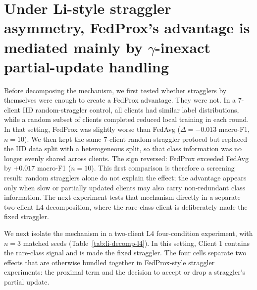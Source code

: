 \documentclass[11pt,a4paper]{report}
\begin{document}


\section{Under Li-style straggler asymmetry, FedProx's advantage is mediated
mainly by $\gamma$-inexact partial-update handling}
\label{sec:li-straggler}

Before decomposing the mechanism, we first tested whether stragglers by
themselves were enough to create a FedProx advantage. They were not. In a
7-client IID random-straggler control, all clients had similar label
distributions, while a random subset of clients completed reduced local
training in each round. In that setting, FedProx was slightly worse than
FedAvg ($\Delta = -0.013$ macro-F1, $n = 10$). We then kept the same
7-client random-straggler protocol but replaced the IID data split with a
heterogeneous split, so that class information was no longer evenly shared
across clients. The sign reversed: FedProx exceeded FedAvg by $+0.017$
macro-F1 ($n = 10$). This first comparison is therefore a screening
result: random stragglers alone do not explain the effect; the advantage
appears only when slow or partially updated clients may also carry
non-redundant class information. The next experiment tests that mechanism
directly in a separate two-client L4 decomposition, where the rare-class
client is deliberately made the fixed straggler.

We next isolate the mechanism in a two-client L4 four-condition experiment,
with $n=3$ matched seeds (Table~\ref{tab:li-decomp-l4}). In this setting,
Client 1 contains the rare-class signal and is made the fixed straggler. The
four cells separate two effects that are otherwise bundled together in
FedProx-style straggler experiments: the proximal term and the decision to
accept or drop a straggler's partial update.
\end{document}
